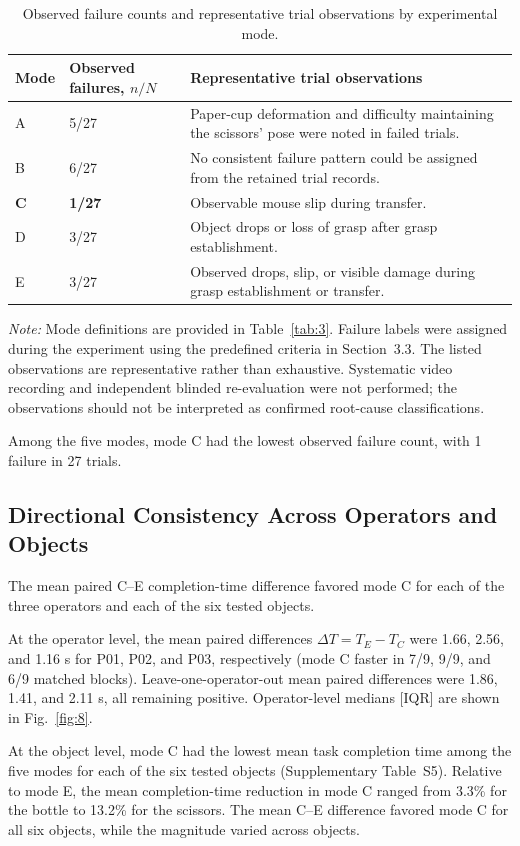 \begin{table}[!t]
\centering
\caption{Observed failure counts and representative trial observations by experimental mode.}
\label{tab:10}
\small
\setlength{\tabcolsep}{6pt}
\renewcommand{\arraystretch}{1.16}
\begin{tabularx}{\textwidth}{@{}p{}p{}Y@{}}
\toprule
Mode & Observed failures, $n/N$ & Representative trial observations \\
\midrule
A & 5/27 & Paper-cup deformation and difficulty maintaining the scissors' pose were noted in failed trials. \\
B & 6/27 & No consistent failure pattern could be assigned from the retained trial records. \\
\textbf{C} & \textbf{1/27} & Observable mouse slip during transfer. \\
D & 3/27 & Object drops or loss of grasp after grasp establishment. \\
E & 3/27 & Observed drops, slip, or visible damage during grasp establishment or transfer. \\
\bottomrule
\end{tabularx}
\par\smallskip
\footnotesize\textit{Note:} Mode definitions are provided in Table~\ref{tab:3}. Failure labels were assigned during the experiment using the predefined criteria in Section~3.3. The listed observations are representative rather than exhaustive. Systematic video recording and independent blinded re-evaluation were not performed; the observations should not be interpreted as confirmed root-cause classifications.
\end{table}
Among the five modes, mode C had the lowest observed failure count, with 1 failure in 27 trials.

\subsection{Directional Consistency Across Operators and Objects}
The mean paired C--E completion-time difference favored mode C for each of the three operators and each of the six tested objects.

At the operator level, the mean paired differences $\Delta T=T_E-T_C$ were 1.66, 2.56, and 1.16 s for P01, P02, and P03, respectively (mode C faster in 7/9, 9/9, and 6/9 matched blocks). Leave-one-operator-out mean paired differences were 1.86, 1.41, and 2.11 s, all remaining positive. Operator-level medians [IQR] are shown in Fig.~\ref{fig:8}.

At the object level, mode C had the lowest mean task completion time among the five modes for each of the six tested objects (Supplementary Table~S5). Relative to mode E, the mean completion-time reduction in mode C ranged from 3.3\% for the bottle to 13.2\% for the scissors. The mean C--E difference favored mode C for all six objects, while the magnitude varied across objects.
